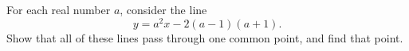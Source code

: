 For each real number $a$, consider the line
\[y=a^2x-2(a-1)(a+1).\]
Show that all of these lines pass through one common point, and find that point.
